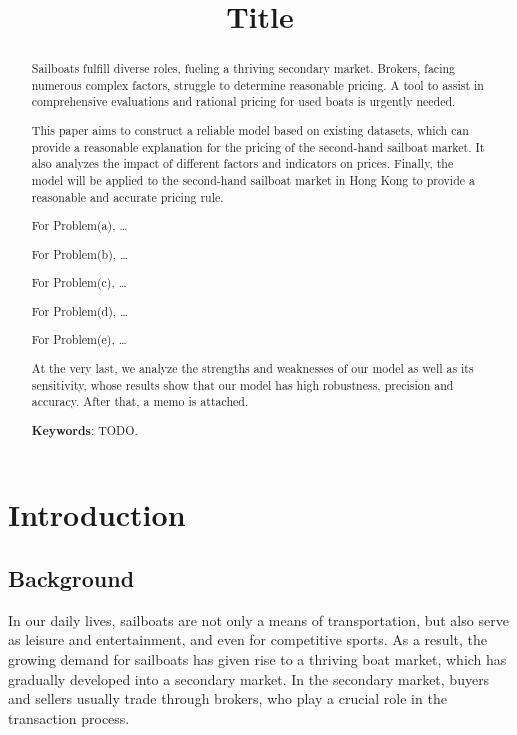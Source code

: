 \documentclass[12pt]{article}  %
\title{Title}  %
\begin{document}
\begin{abstract}
    Sailboats fulfill diverse roles, fueling a thriving secondary market. Brokers, facing numerous complex factors, struggle to determine reasonable pricing. A tool to assist in comprehensive evaluations and rational pricing for used boats is urgently needed.
    
    This paper aims to construct a reliable model based on existing datasets, which can provide a reasonable explanation for the pricing of the second-hand sailboat market. It also analyzes the impact of different factors and indicators on prices. Finally, the model will be applied to the second-hand sailboat market in Hong Kong to provide a reasonable and accurate pricing rule.

    For Problem(a), \dots

    For Problem(b), \dots

    For Problem(c), \dots

    For Problem(d), \dots

    For Problem(e), \dots

    At the very last, we analyze the strengths and weaknesses of our model as well as its
sensitivity, whose results show that our model has high robustness, precision and accuracy.
After that, a memo is attached.




    \vspace{5pt}
    \textbf{Keywords}: TODO.

\end{abstract}

\maketitle  %
\tableofcontents  %


\section{Introduction}
\subsection{Background}
In our daily lives, sailboats are not only a means of transportation, but also serve as leisure and entertainment, and even for competitive sports. As a result, the growing demand for sailboats has given rise to a thriving boat market, which has gradually developed into a secondary market. In the secondary market, buyers and sellers usually trade through brokers, who play a crucial role in the transaction process.
\end{document}
